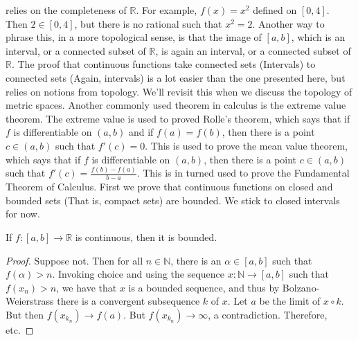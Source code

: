 \documentclass[crop=false,class=book,oneside]{standalone}
\begin{document}
            relies on the completeness of $\mathbb{R}$. For
            example, $f(x)=x^{2}$ defined on $[0,4]$.
            Then $2\in[0,4]$, but there is no
            rational such that $x^{2}=2$.
            Another way to phrase this, in a more topological
            sense, is that the image of $[a,b]$, which is an
            interval, or a connected subset of $\mathbb{R}$,
            is again an interval, or a connected subset of
            $\mathbb{R}$. The proof that continuous
            functions take connected sets (Intervals)
            to connected sets (Again, intervals) is a lot
            easier than the one presented
            here, but relies on notions from topology.
            We'll revisit this when we
            discuss the topology of metric spaces.
            Another commonly used theorem in calculus
            is the extreme value theorem.
            The extreme value is used to proved Rolle's theorem,
            which says that if $f$ is differentiable on $(a,b)$
            and if $f(a)=f(b)$, then there is a point
            $c\in(a,b)$ such that $f'(c)=0$. This is used to
            prove the mean value theorem, which says that
            if $f$ is differentiable on $(a,b)$,
            then there is a point $c\in(a,b)$ such that
            $f'(c)=\frac{f(b)-f(a)}{b-a}$. This is in
            turned used to prove the Fundamental Theorem
            of Calculus. First we prove that continuous functions
            on closed and bounded sets (That is,
            compact sets) are bounded. We stick to
            closed intervals for now.
            \begin{theorem}
                If $f:[a,b]\rightarrow\mathbb{R}$ is
                continuous, then it is bounded.
            \end{theorem}
            \begin{proof}
                Suppose not. Then for all $n\in\mathbb{N}$, 
                there is an $\alpha\in[a,b]$ such that
                $f(\alpha)>n$. Invoking choice and using the
                sequence $x:\mathbb{N}\rightarrow[a,b]$ such
                that $f(x_{n})>n$, we have that
                $x$ is a bounded sequence, and thus by
                Bolzano-Weierstrass there is a convergent
                subsequence $k$ of $x$. Let $a$ be the limit of
                $x\circ{k}$.
                But then $f(x_{k_{n}})\rightarrow{f(a)}$.
                But $f(x_{k_{n}})\rightarrow\infty$,
                a contradiction. Therefore, etc.
            \end{proof}
\end{document}
